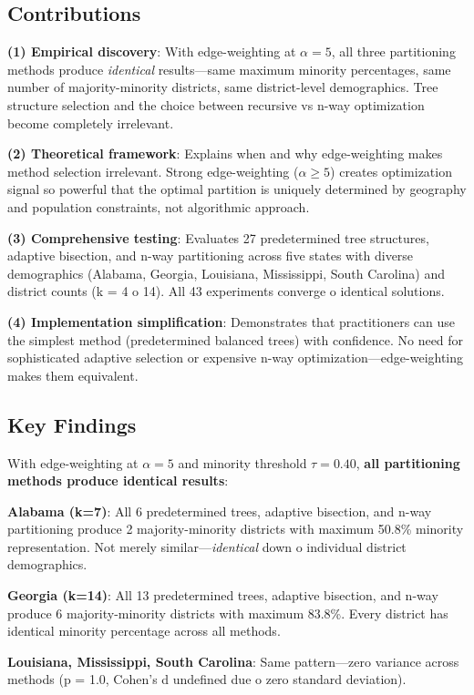 \subsection{Contributions}

\textbf{(1) Empirical discovery}: With edge-weighting at $\alpha = 5$, all three partitioning methods produce \textit{identical} results—same maximum minority percentages, same number of majority-minority districts, same district-level demographics. Tree structure selection and the choice between recursive vs n-way optimization become completely irrelevant.

\textbf{(2) Theoretical framework}: Explains when and why edge-weighting makes method selection irrelevant. Strong edge-weighting ($\alpha \geq 5$) creates optimization signal so powerful that the optimal partition is uniquely determined by geography and population constraints, not algorithmic approach.

\textbf{(3) Comprehensive testing}: Evaluates 27 predetermined tree structures, adaptive bisection, and n-way partitioning across five states with diverse demographics (Alabama, Georgia, Louisiana, Mississippi, South Carolina) and district counts (k = 4 	o 14). All 43 experiments converge 	o identical solutions.

\textbf{(4) Implementation simplification}: Demonstrates that practitioners can use the simplest method (predetermined balanced trees) with confidence. No need for sophisticated adaptive selection or expensive n-way optimization—edge-weighting makes them equivalent.

\subsection{Key Findings}

With edge-weighting at $\alpha = 5$ and minority threshold $\tau = 0.40$, \textbf{all partitioning methods produce identical results}:

\textbf{Alabama (k=7)}: All 6 predetermined trees, adaptive bisection, and n-way partitioning produce 2 majority-minority districts with maximum 50.8\% minority representation. Not merely similar—\textit{identical} down 	o individual district demographics.

\textbf{Georgia (k=14)}: All 13 predetermined trees, adaptive bisection, and n-way produce 6 majority-minority districts with maximum 83.8\%. Every district has identical minority percentage across all methods.

\textbf{Louisiana, Mississippi, South Carolina}: Same pattern—zero variance across methods (p = 1.0, Cohen's d undefined due 	o zero standard deviation).

